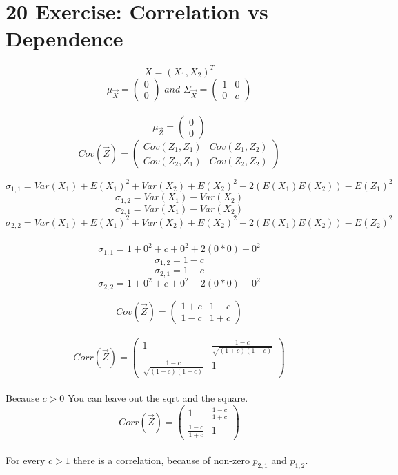 \documentclass[pdftex,12pt,a4paper]{article}
\begin{document}
\section*{20 Exercise: Correlation vs Dependence}
	$$X=(X_1,X_2)^T$$
    $$\mu_{\vec{X}} =
    	\begin{pmatrix}
    		0\\
    		0
    	\end{pmatrix}
    \textit{ and }  
    \Sigma_{\vec{X}} =
    	\begin{pmatrix}
    		1 & 0\\
    		0 & c
    	\end{pmatrix}$$
    \\
    $$\mu_{\vec{Z}} =
    	\begin{pmatrix}
    		0\\
    		0
    	\end{pmatrix}$$
    $$Cov(\vec{Z})=
    	\begin{pmatrix}
    		Cov(Z_1, Z_1) & Cov(Z_1, Z_2)\\
    		Cov(Z_2, Z_1) & Cov(Z_2, Z_2)
    	\end{pmatrix}$$
    
    $$ \sigma_{1,1} = Var(X_1) + E(X_1)^2 + Var(X_2) + E(X_2)^2 + 2(E(X_1)E(X_2)) - E(Z_1)^2$$
    $$ \sigma_{1,2} = Var(X_1) - Var(X_2)$$
    $$ \sigma_{2,1} = Var(X_1) - Var(X_2)$$
    $$ \sigma_{2,2} = Var(X_1) + E(X_1)^2 + Var(X_2) + E(X_2)^2 - 2(E(X_1)E(X_2)) - E(Z_2)^2$$\\
    
    $$ \sigma_{1,1} = 1 + 0^2 + c + 0^2 + 2(0 * 0) - 0^2$$
    $$ \sigma_{1,2} = 1 - c$$
    $$ \sigma_{2,1} = 1 - c$$
    $$ \sigma_{2,2} = 1 + 0^2 + c + 0^2 - 2(0 * 0) - 0^2$$
    
    $$Cov(\vec{Z})=
    	\begin{pmatrix}
    		1 + c & 1 - c\\
    		1 - c & 1 + c
    	\end{pmatrix}$$\\
    	
    $$Corr(\vec{Z}) = 
    	\begin{pmatrix}
    		1  & \frac{1 - c}{\sqrt{(1+c)(1+c)}}\\
    		\frac{1 - c}{\sqrt{(1+c)(1+c)}} & 1
    	\end{pmatrix}$$\\
   	Because $c > 0$ You can leave out the sqrt and the square.
    $$Corr(\vec{Z}) = 
    	\begin{pmatrix}
    		1  & \frac{1 - c}{1+c}\\
    		\frac{1 - c}{1+c} & 1
    	\end{pmatrix}$$\\
    For every $c > 1$ there is a correlation, because of non-zero $p_{2,1}$ and $p_{1,2}$.
    
\end{document}
